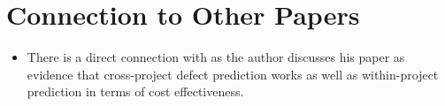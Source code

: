 \documentclass[english]{article}
\begin{document}
\section*{Connection to Other Papers}
\begin{itemize}
\item There is a direct connection with \cite{Rahman} as the author discusses his paper as evidence that cross-project defect prediction works as well as within-project prediction in terms of cost effectiveness.

\end{itemize}


\end{document}
